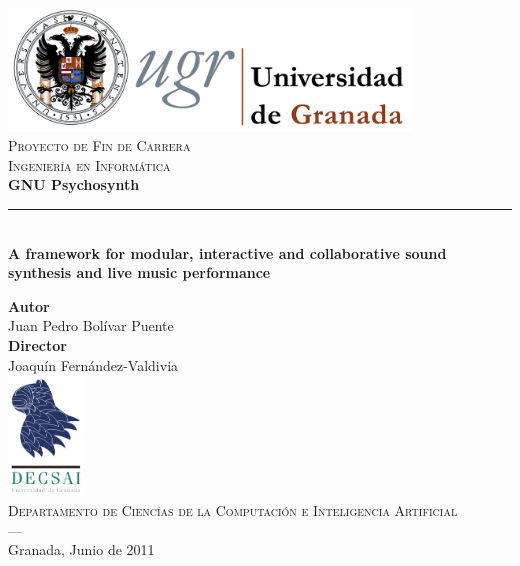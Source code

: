 
\begin{titlepage}
  \newlength{\centeroffset}
  \setlength{\centeroffset}{-0.5\oddsidemargin}
  \addtolength{\centeroffset}{0.5\evensidemargin}
  \thispagestyle{empty}


  \begin{minipage}{\textwidth}  
    \centering
    \includegraphics[width=0.8\textwidth]{pic/logo-ugr.png}\\[1.4cm]

    \textsc{\Large Proyecto de Fin de Carrera\\[0.2cm]}
    \textsc{Ingeniería en Informática}\\[1cm]
    
    {\Huge\bfseries\sffamily GNU Psychosynth}
    \noindent\rule[-1ex]{\textwidth}{3pt}\\[3.5ex]
    {\large\bfseries 
      A framework for modular, interactive and collaborative sound
      synthesis and live music performance
      \\[4cm]}
  \end{minipage}

  \vspace{1cm}
  
  
  \begin{minipage}{\textwidth}
    \centering
    \textbf{Autor}\\ {Juan Pedro Bolívar Puente}\\[2.5ex]
    \textbf{Director}\\
    {Joaquín Fernández-Valdivia}\\[2cm]
    \includegraphics[width=0.15\textwidth]{pic/logo-decsai.png}\\[0.1cm]
    \textsc{Departamento de Ciencías de la Computación e Inteligencia Artificial}\\
    \textsc{---}\\
    Granada, Junio de 2011
  \end{minipage}


\end{titlepage}


